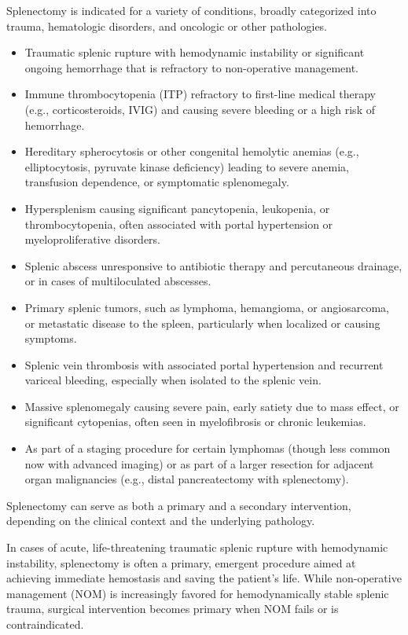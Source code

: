 Splenectomy is indicated for a variety of conditions, broadly categorized into trauma, hematologic disorders, and oncologic or other pathologies.

\begin{itemize}
  \item Traumatic splenic rupture with hemodynamic instability or significant ongoing hemorrhage that is refractory to non-operative management.
  \item Immune thrombocytopenia (ITP) refractory to first-line medical therapy (e.g., corticosteroids, IVIG) and causing severe bleeding or a high risk of hemorrhage.
  \item Hereditary spherocytosis or other congenital hemolytic anemias (e.g., elliptocytosis, pyruvate kinase deficiency) leading to severe anemia, transfusion dependence, or symptomatic splenomegaly.
  \item Hypersplenism causing significant pancytopenia, leukopenia, or thrombocytopenia, often associated with portal hypertension or myeloproliferative disorders.
  \item Splenic abscess unresponsive to antibiotic therapy and percutaneous drainage, or in cases of multiloculated abscesses.
  \item Primary splenic tumors, such as lymphoma, hemangioma, or angiosarcoma, or metastatic disease to the spleen, particularly when localized or causing symptoms.
  \item Splenic vein thrombosis with associated portal hypertension and recurrent variceal bleeding, especially when isolated to the splenic vein.
  \item Massive splenomegaly causing severe pain, early satiety due to mass effect, or significant cytopenias, often seen in myelofibrosis or chronic leukemias.
  \item As part of a staging procedure for certain lymphomas (though less common now with advanced imaging) or as part of a larger resection for adjacent organ malignancies (e.g., distal pancreatectomy with splenectomy).
\end{itemize}

Splenectomy can serve as both a primary and a secondary intervention, depending on the clinical context and the underlying pathology.

In cases of acute, life-threatening traumatic splenic rupture with hemodynamic instability, splenectomy is often a primary, emergent procedure aimed at achieving immediate hemostasis and saving the patient's life. While non-operative management (NOM) is increasingly favored for hemodynamically stable splenic trauma, surgical intervention becomes primary when NOM fails or is contraindicated.

